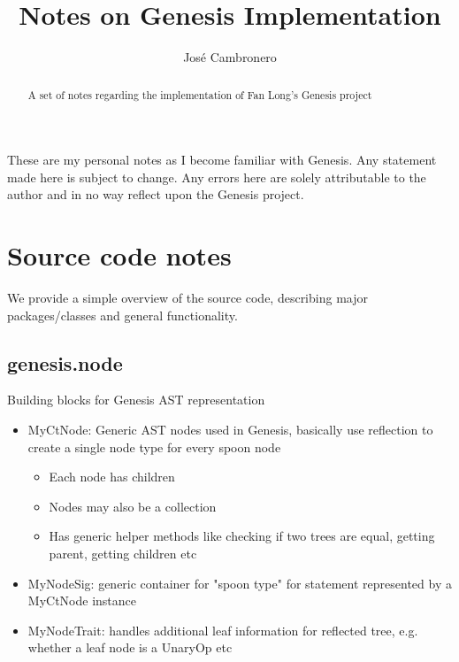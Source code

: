 \documentclass{article}
\date{\displaydate{last-update-date}}
\title{Notes on Genesis Implementation}
\author{Jos\'e Cambronero}
\begin{document}
\maketitle

\newcommand{\unclear}[1]{{\color{red} ??? \textbf{#1}}}

\begin{abstract}
A set of notes regarding the implementation of Fan Long's Genesis project
\end{abstract}

These are my personal notes as I become familiar with Genesis. Any statement made here is subject to change. Any errors here
are solely attributable to the author and in no way reflect upon the Genesis project.


\section{Source code notes}
We provide a simple overview of the source code, describing major packages/classes and general functionality. 


\subsection{genesis.node}
Building blocks for Genesis AST representation
\begin{itemize}
\item MyCtNode: Generic AST nodes used in Genesis, basically use reflection to create a single node type for every spoon node
 	\begin{itemize}
     		\item Each node has children
     		\item Nodes may also be a collection
     		\item Has generic helper methods like checking if two trees are equal, getting parent, getting children etc
	\end{itemize}	
\item MyNodeSig: generic container for "spoon type" for statement represented by a MyCtNode instance
\item MyNodeTrait:  handles additional leaf information for reflected tree, e.g. whether a leaf node is a UnaryOp etc
\end{itemize}
\end{document}
